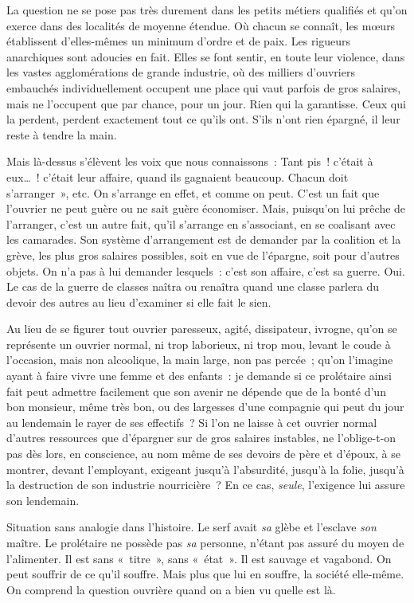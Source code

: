 \documentclass[french,twoside]{book} %
\newcommand{\astermono}{\medskip\centerline{\color{rubric}\large\selectfont{\syms ✻}}\medskip\par}%
\begin{document}
La question ne se pose pas très durement dans les petits métiers qualifiés et qu’on exerce dans des localités de moyenne étendue. Où chacun se connaît, les mœurs établissent d’elles-mêmes un minimum d’ordre et de paix. Les rigueurs anarchiques sont adoucies en fait. Elles se font sentir, en toute leur violence, dans les vastes agglomérations de grande industrie, où des milliers d’ouvriers embauchés individuellement occupent une place qui vaut parfois de gros salaires, mais ne l’occupent que par chance, pour un jour. Rien qui la garantisse. Ceux qui la perdent, perdent exactement tout ce qu’ils ont. S’ils n’ont rien épargné, il leur reste à tendre la main.\par
Mais là-dessus s’élèvent les voix que nous connaissons : Tant pis ! c’était à eux… ! c’était leur affaire, quand ils gagnaient beaucoup. Chacun doit s’arranger », etc. On s’arrange en effet, et comme on peut. C’est un fait que l’ouvrier ne peut guère ou ne sait guère économiser. Mais, puisqu’on lui prêche de l’arranger, c’est un autre fait, qu’il s’arrange en s’associant, en se coalisant avec les camarades. Son système d’arrangement est de demander par la coalition et la grève, les plus gros salaires possibles, soit en vue de l’épargne, soit pour d’autres objets. On n’a pas à lui demander lesquels : c’est son affaire, c’est sa guerre. Oui. Le cas de la guerre de classes naîtra ou renaîtra quand une classe parlera du devoir des autres au lieu d’examiner si elle fait le sien.\par

\astermono

\noindent Au lieu de se figurer tout ouvrier paresseux, agité, dissipateur, ivrogne, qu’on se représente un ouvrier normal, ni trop laborieux, ni trop mou, levant le coude à l’occasion, mais non alcoolique, la main large, non pas percée ; qu’on l’imagine ayant à faire vivre une femme et des enfants : je demande si ce prolétaire ainsi fait peut admettre facilement que son avenir ne dépende que de la bonté d’un bon monsieur, même très bon, ou des largesses d’une compagnie qui peut du jour au lendemain le rayer de ses effectifs ? Si l’on ne laisse à cet ouvrier normal d’autres ressources que d’épargner sur de gros salaires instables, ne l’oblige-t-on pas dès lors, en conscience, au nom même de ses devoirs de père et d’époux, à se montrer, devant l’employant, exigeant jusqu’à l’absurdité, jusqu’à la folie, jusqu’à la destruction de son industrie nourricière ? En ce cas, \emph{seule}, l’exigence lui assure son lendemain.\par
Situation sans analogie dans l’histoire. Le serf avait \emph{sa} glèbe et l’esclave \emph{son} maître. Le prolétaire ne possède pas \emph{sa} personne, n’étant pas assuré du moyen de l’alimenter. Il est sans « titre », sans « état ». Il est sauvage et vagabond. On peut souffrir de ce qu’il souffre. Mais plus que lui en souffre, la société elle-même. On comprend la question ouvrière quand on a bien vu quelle est là.\par
\end{document}
